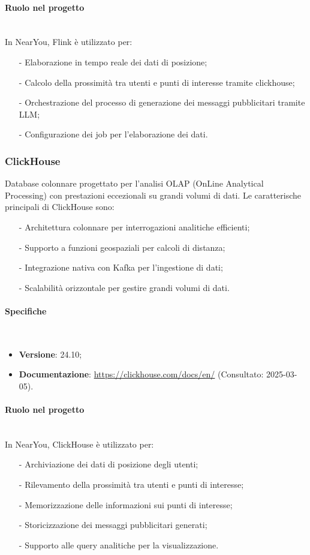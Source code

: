 \documentclass[10pt]{article}
\newcommand{\myparagraph}[1]{\paragraph{#1}\mbox{}\\}
\begin{document}
\myparagraph{Ruolo nel progetto}
In NearYou, Flink è utilizzato per:
\begin{itemize}
    \item[-] Elaborazione in tempo reale dei dati di posizione;
    \item[-] Calcolo della prossimità tra utenti e punti di interesse tramite clickhouse;
    \item[-] Orchestrazione del processo di generazione dei messaggi pubblicitari tramite LLM;
    \item[-] Configurazione dei job per l'elaborazione dei dati.
\end{itemize}

\subsubsection{ClickHouse}
Database colonnare progettato per l'analisi OLAP (OnLine Analytical Processing) con prestazioni eccezionali su grandi volumi di dati. Le caratterische principali di ClickHouse sono:
\begin{itemize}
    \item[-] Architettura colonnare per interrogazioni analitiche efficienti;
    \item[-] Supporto a funzioni geospaziali per calcoli di distanza;
    \item[-] Integrazione nativa con Kafka per l'ingestione di dati;
    \item[-] Scalabilità orizzontale per gestire grandi volumi di dati.
\end{itemize}


\myparagraph{Specifiche}
\begin{itemize}
    \item \textbf{Versione}: 24.10;
    \item \textbf{Documentazione}: \textcolor{blue}{\url{https://clickhouse.com/docs/en/}} (Consultato: 2025-03-05).
\end{itemize}

\myparagraph{Ruolo nel progetto}
In NearYou, ClickHouse è utilizzato per:
\begin{itemize}
    \item[-] Archiviazione dei dati di posizione degli utenti;
    \item[-] Rilevamento della prossimità tra utenti e punti di interesse;
    \item[-] Memorizzazione delle informazioni sui punti di interesse;
    \item[-] Storicizzazione dei messaggi pubblicitari generati;
    \item[-] Supporto alle query analitiche per la visualizzazione.
\end{itemize}
\end{document}

